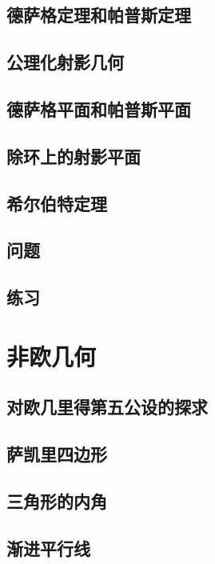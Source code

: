 \documentclass[cn,fancy,blue,11pt]{elegantbook}
\begin{document}
\section{德萨格定理和帕普斯定理}

\section{公理化射影几何}

\section{德萨格平面和帕普斯平面}

\section{除环上的射影平面}

\section{希尔伯特定理}

\section{问题}

\section{练习}

\chapter{非欧几何}

\section{对欧几里得第五公设的探求}

\section{萨凯里四边形}

\section{三角形的内角}

\section{渐进平行线}
\end{document}
